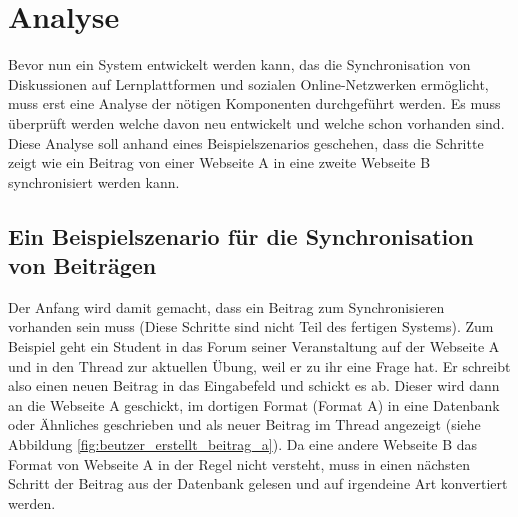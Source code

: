 
\chapter{Analyse} %
\label{cha:analyse}


Bevor nun ein System entwickelt werden kann, das die Synchronisation von Diskussionen auf Lernplattformen und sozialen Online-Netzwerken ermöglicht, muss erst eine Analyse der nötigen Komponenten durchgeführt werden. Es muss überprüft werden welche davon neu entwickelt und welche schon vorhanden sind. Diese Analyse soll anhand eines Beispielszenarios geschehen, dass die Schritte zeigt wie ein Beitrag von einer Webseite A in eine zweite Webseite B synchronisiert werden kann. 

\section{Ein Beispielszenario für die Synchronisation von Beiträgen} %
\label{sec:analyse_beispiel}

Der Anfang wird damit gemacht, dass ein Beitrag zum Synchronisieren vorhanden sein muss (Diese Schritte sind nicht Teil des fertigen Systems). Zum Beispiel geht ein Student in das Forum seiner Veranstaltung auf der Webseite A und in den Thread zur aktuellen Übung, weil er zu ihr eine Frage hat. Er schreibt also einen neuen Beitrag in das Eingabefeld und schickt es ab. Dieser wird dann an die Webseite A geschickt, im dortigen Format (Format A) in eine Datenbank oder Ähnliches geschrieben und als neuer Beitrag im Thread angezeigt (siehe Abbildung \ref{fig:beutzer_erstellt_beitrag_a}). Da eine andere Webseite B das Format von Webseite A in der Regel nicht versteht, muss in einen nächsten Schritt der Beitrag aus der Datenbank gelesen und auf irgendeine Art konvertiert werden. 

